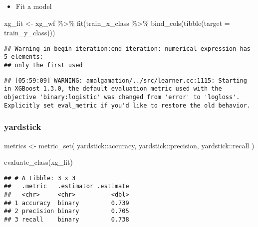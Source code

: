\documentclass[
]{book}
\newenvironment{Shaded}{\begin{snugshade}}{\end{snugshade}}
\newcommand{\AttributeTok}[1]{\textcolor[rgb]{0.77,0.63,0.00}{#1}}
\newcommand{\FunctionTok}[1]{\textcolor[rgb]{0.00,0.00,0.00}{#1}}
\newcommand{\NormalTok}[1]{#1}
\newcommand{\OtherTok}[1]{\textcolor[rgb]{0.56,0.35,0.01}{#1}}
\newcommand{\SpecialCharTok}[1]{\textcolor[rgb]{0.00,0.00,0.00}{#1}}
\providecommand{\tightlist}{%
  \setlength{\itemsep}{0pt}\setlength{\parskip}{0pt}}
\begin{document}
\begin{itemize}
\tightlist
\item
  Fit a model
\end{itemize}

\begin{Shaded}
\begin{Highlighting}[]
\NormalTok{xg\_fit }\OtherTok{\textless{}{-}}\NormalTok{ xg\_wf }\SpecialCharTok{\%\textgreater{}\%} \FunctionTok{fit}\NormalTok{(train\_x\_class }\SpecialCharTok{\%\textgreater{}\%} \FunctionTok{bind\_cols}\NormalTok{(}\FunctionTok{tibble}\NormalTok{(}\AttributeTok{target =}\NormalTok{ train\_y\_class)))}
\end{Highlighting}
\end{Shaded}

\begin{verbatim}
## Warning in begin_iteration:end_iteration: numerical expression has 5 elements:
## only the first used
\end{verbatim}

\begin{verbatim}
## [05:59:09] WARNING: amalgamation/../src/learner.cc:1115: Starting in XGBoost 1.3.0, the default evaluation metric used with the objective 'binary:logistic' was changed from 'error' to 'logloss'. Explicitly set eval_metric if you'd like to restore the old behavior.
\end{verbatim}

\hypertarget{yardstick-3}{%
\subsubsection{yardstick}\label{yardstick-3}}

\begin{Shaded}
\begin{Highlighting}[]
\NormalTok{metrics }\OtherTok{\textless{}{-}} \FunctionTok{metric\_set}\NormalTok{(}
\NormalTok{  yardstick}\SpecialCharTok{::}\NormalTok{accuracy,}
\NormalTok{  yardstick}\SpecialCharTok{::}\NormalTok{precision,}
\NormalTok{  yardstick}\SpecialCharTok{::}\NormalTok{recall}
\NormalTok{)}

\FunctionTok{evaluate\_class}\NormalTok{(xg\_fit)}
\end{Highlighting}
\end{Shaded}

\begin{verbatim}
## # A tibble: 3 x 3
##   .metric   .estimator .estimate
##   <chr>     <chr>          <dbl>
## 1 accuracy  binary         0.739
## 2 precision binary         0.705
## 3 recall    binary         0.738
\end{verbatim}
\end{document}
